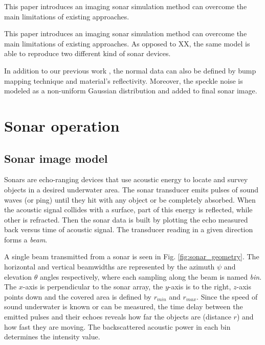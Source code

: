 \documentclass[final,5p,times]{elsarticle}
\begin{document}
This paper introduces an imaging sonar simulation method can overcome the main limitations of existing approaches.

This paper introduces an imaging sonar simulation method can overcome the main limitations of existing approaches. As opposed to XX, the same model is able to reproduce two different kind of sonar devices.



In addition to our previous work \cite{cerqueira2016}, the normal data can also be defined by bump mapping technique and material's reflectivity. Moreover, the speckle noise is modeled as a non-uniform Gaussian distribution and added to final sonar image.


\section{Sonar operation}
\label{background}

\subsection{Sonar image model}
\label{sonar:model}

Sonars are echo-ranging devices that use acoustic energy to locate and survey objects in a desired underwater area. The sonar transducer emits pulses of sound waves (or ping) until they hit with any object or be completely absorbed. When the acoustic signal collides with a surface, part of this energy is reflected, while other is refracted. Then the sonar data is built by plotting the echo measured back versus time of acoustic signal. The transducer reading in a given direction forms a \textit{beam}.

A single beam transmitted from a sonar is seen in Fig. \ref{fig:sonar_geometry}. The horizontal and vertical beamwidths are represented by the azimuth $\psi$ and elevation $\theta$ angles respectively, where each sampling along the beam is named \textit{bin}. The $x$-axis is perpendicular to the sonar array, the $y$-axis is to the right, $z$-axis points down and the covered area is defined by $r_{min}$ and $r_{max}$. Since the speed of sound underwater is known or can be measured, the time delay between the emitted pulses and their echoes reveals how far the objects are (distance $r$) and how fast they are moving. The backscattered acoustic power in each bin determines the intensity value.
\end{document}
